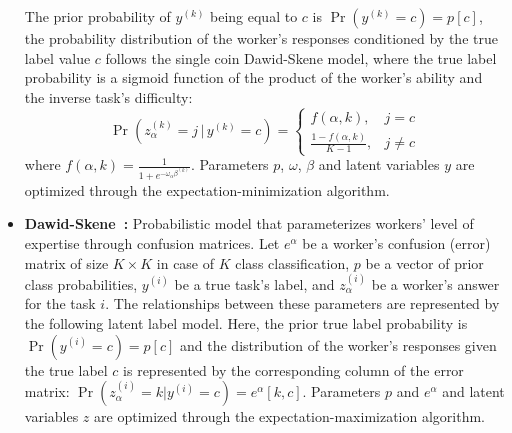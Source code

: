 \documentclass[sn-nature]{bst/sn-jnl}
\begin{document}
\begin{itemize}
    The prior probability of $y^{(k)}$ being equal to $c$ is $\Pr(y^{(k)} = c) = p[c]$,
    the probability distribution of the worker's responses conditioned by the true label value $c$ follows the single coin Dawid-Skene model, where the true label probability is a sigmoid function of the product of the worker's ability and the inverse task's difficulty:
    \begin{equation}
        \Pr \left( z^{(k)}_\alpha = j \, \vert \, y^{(k)} = c \right) = \begin{cases}f(\alpha, k), & j = c \\ \frac{1 - f(\alpha, k)}{K-1}, & j \neq c \end{cases}
    \end{equation}
    where $f(\alpha, k) = \frac{1}{1 + e^{-\omega_{\alpha} \beta^{(k)} }}$.
    Parameters $p$, $\omega$, $\beta$ and latent variables $y$ are optimized through the expectation-minimization algorithm.
    \item \textbf{Dawid-Skene~\cite{dawid_Maximum_1979,crowdkit_webpage_documentation}:}
    Probabilistic model that parameterizes workers' level of expertise through confusion matrices.  Let $e^{\alpha}$ be a worker's confusion (error) matrix of size $K \times K$ in case of $K$ class classification, $p$ be a vector of prior class probabilities, $y^{(i)}$ be a true task's label, and $z_{\alpha}^{(i)}$ be a worker's answer for the task $i$. The relationships between these parameters are represented by the following latent label model.
    Here, the prior true label probability is $\Pr(y^{(i)} = c) = p[c]$ and the distribution of the worker's responses given the true label $c$ is represented by the
    corresponding column of the error matrix: $\Pr(z_{\alpha}^{(i)} = k \vert y^{(i)} = c) = e^{\alpha}[k, c]$.
    Parameters $p$ and $e^{\alpha}$ and latent variables $z$ are optimized through the expectation-maximization algorithm.
\end{itemize}
\end{document}
